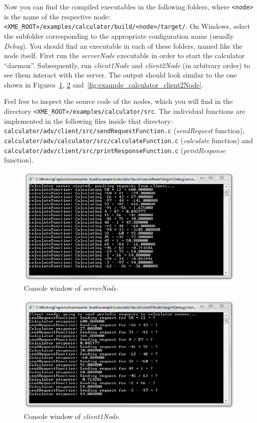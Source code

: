 Now you can find the compiled executables in the following folders, where \texttt{<node>} is the name of the respective node:
\texttt{<XME\_ROOT>/examples/calculator/build/<node>/target/}.
%
On Windows, select the subfolder corresponding to the appropriate configuration name (usually \emph{Debug}).
You should find an executable in each of these folders, named like the node itself.
First run the \emph{serverNode} executable in order to start the calculator ``daemon''.
Subsequently, run \emph{client1Node} and \emph{client2Node} (in arbitrary order) to see them interact with the server.
The output should look similar to the one shown in Figures~\ref{fig:example_calculator_serverNode}, \ref{fig:example_calculator_client1Node}
and~\ref{fig:example_calculator_client2Node}.

Feel free to inspect the source code of the nodes, which you will find in the directory \texttt{<XME\_ROOT>/examples/calculator/src}.
The individual functions are implemented in the following files inside that directory:
\texttt{calculator/adv/client/src/sendRequestFunction.c} (\emph{sendRequest} function),
\texttt{calculator/adv/calculator/src/calculateFunction.c} (\emph{calculate} function) and
\texttt{calculator/adv/client/src/printResponseFunction.c} (\emph{printResponse} function).

\begin{figure}[htpb]
	\centering
	\includegraphics[scale=0.7]{figures/example_calculator_serverNode.png}
	\caption{Console window of \emph{serverNode}.}
	\label{fig:example_calculator_serverNode}
\end{figure}

\begin{figure}[htpb]
	\centering
	\includegraphics[scale=0.7]{figures/example_calculator_client1Node.png}
	\caption{Console window of \emph{client1Node}.}
	\label{fig:example_calculator_client1Node}
\end{figure}

